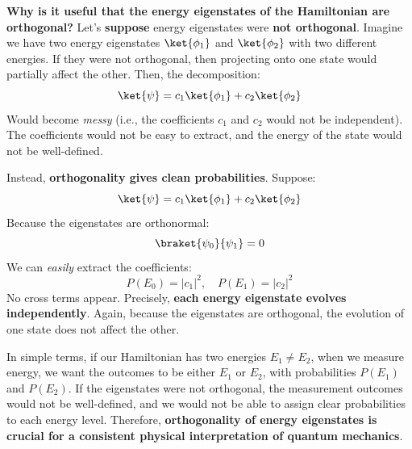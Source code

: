 \highspace
\textcolor{Green3}{ \textbf{Why is it useful that the energy eigenstates of the Hamiltonian are orthogonal?}} Let's \textbf{suppose} energy eigenstates were \textbf{not orthogonal}. Imagine we have two energy eigenstates $\ket{\phi_1}$ and $\ket{\phi_2}$ with two different energies. If they were not orthogonal, then projecting onto one state would partially affect the other. Then, the decomposition:
\begin{equation*}
    \ket{\psi} = c_1 \ket{\phi_1} + c_2 \ket{\phi_2}
\end{equation*}
Would become \emph{messy} (i.e., the coefficients $c_1$ and $c_2$ would not be independent). The coefficients would not be easy to extract, and the energy of the state would not be well-defined.

\highspace
Instead, \textbf{orthogonality gives clean probabilities}. Suppose:
\begin{equation*}
    \ket{\psi} = c_1 \ket{\phi_1} + c_2 \ket{\phi_2}
\end{equation*}
Because the eigenstates are orthonormal:
\begin{equation*}
    \braket{\psi_{0}}{\psi_{1}} = 0
\end{equation*}
We can \emph{easily} extract the coefficients:
\begin{equation*}
    P\left(E_0\right) = \left|c_1\right|^2, \quad P\left(E_1\right) = \left|c_2\right|^2
\end{equation*}
No cross terms appear. Precisely, \textbf{each energy eigenstate evolves independently}. Again, because the eigenstates are orthogonal, the evolution of one state does not affect the other.

\highspace
In simple terms, if our Hamiltonian has two energies $E_{1} \neq E_{2}$, when we measure energy, we want the outcomes to be either $E_{1}$ or $E_{2}$, with probabilities $P(E_1)$ and $P(E_2)$. If the eigenstates were not orthogonal, the measurement outcomes would not be well-defined, and we would not be able to assign clear probabilities to each energy level. Therefore, \textbf{orthogonality of energy eigenstates is crucial for a consistent physical interpretation of quantum mechanics}.